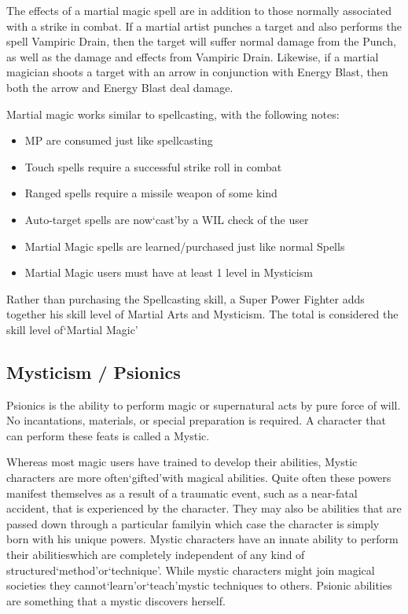 \documentclass[twoside]{book}
\begin{document}
    {  
    The effects of a martial magic spell are in addition to those normally associated with a strike in combat. If a martial artist punches a target and also performs the spell Vampiric Drain, then the target will suffer normal damage from the Punch, as well as the damage and effects from Vampiric Drain. Likewise, if a martial magician shoots a target with an arrow in conjunction with Energy Blast, then both the arrow and Energy Blast deal damage.
    }
  
    {  
    Martial magic works similar to spellcasting, with the following notes:
    }
  
\begin{itemize}
      
  \item MP are consumed just like spellcasting
  \item Touch spells require a successful strike roll in combat
  \item Ranged spells require a missile weapon of some kind
  \item Auto-target spells are now`cast'by a WIL check of the user
  \item Martial Magic spells are learned/purchased just like normal Spells
  \item Martial Magic users must have at least 1 level in Mysticism
\end{itemize}
  
    {  
    Rather than purchasing the Spellcasting skill, a Super Power Fighter adds together his skill level of Martial Arts and Mysticism. The total is considered the skill level of`Martial Magic'
    }
  
    

\subsection{Mysticism / Psionics}
    
    {  
    Psionics is the ability to perform magic or supernatural acts by pure force of will. No incantations, materials, or special preparation is required. A character that can perform these feats is called a Mystic.
    }
  
    {  
    Whereas most magic users have trained to develop their abilities, Mystic characters are more often`gifted'with magical abilities. Quite often these powers manifest themselves as a result of a traumatic event, such as a near-fatal accident, that is experienced by the character. They may also be abilities that are passed down through a particular familyin which case the character is simply born with his unique powers. Mystic characters have an innate ability to perform their abilitieswhich are completely independent of any kind of structured`method'or`technique'. While mystic characters might join magical societies they cannot`learn'or`teach'mystic techniques to others. Psionic abilities are something that a mystic discovers herself.
    }
  
\end{document}
